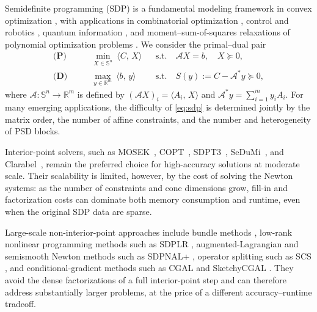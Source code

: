 \documentclass[11pt]{article}
\theoremstyle{definition}
\theoremstyle{remark}
\newcommand{\R}{\mathbb{R}}                 %
\newcommand{\Sym}[1]{\mathbb{S}^{#1}}       %
\newcommand{\inner}[2]{\langle #1,\, #2\rangle}
\newcommand{\Aop}{\mathcal{A}}              %
\newcommand{\Aadj}{\mathcal{A}^{*}}         %
\newcommand{\Cobj}{C}                       %
\newcommand{\bvec}{b}                       %
\newcommand{\Xvar}{X}                       %
\newcommand{\yvar}{y}                       %
\newcommand{\Zslack}{S}                     %
\begin{document}
Semidefinite programming (SDP) is a fundamental modeling framework in convex
optimization \cite{Todd2001,BoydVandenberghe2004}, with applications in combinatorial optimization \cite{han2002improved,burer2001projected}, control and
robotics \cite{kang2024fast,kang2025global}, quantum information \cite{childs2007quantum,low2025fast}, and moment--sum-of-squares relaxations of
polynomial optimization problems \cite{lasserre2001global,lasserre2006convergent}.  We consider the primal--dual pair
\begin{equation}
\begin{aligned}
\textbf{(P)}\qquad
&\min_{\Xvar\in\Sym{n}}\ \inner{\Cobj}{\Xvar}
&&\text{s.t.}\quad
  \Aop\Xvar=\bvec,\quad \Xvar\succeq0, \\
\textbf{(D)}\qquad
&\max_{\yvar\in\R^m}\ \inner{\bvec}{\yvar}
&&\text{s.t.}\quad
  \Zslack(\yvar):=\Cobj-\Aadj\yvar\succeq0,
\end{aligned}
\label{eq:sdp}
\end{equation}
where $\Aop:\Sym{n}\to\R^m$ is defined by
$(\Aop\Xvar)_i=\inner{A_i}{\Xvar}$ and
$\Aadj\yvar=\sum_{i=1}^m \yvar_i A_i$.
For many emerging applications, the difficulty of \eqref{eq:sdp} is determined
jointly by the matrix order, the number of affine constraints, and the number
and heterogeneity of PSD blocks.

Interior-point solvers, such as MOSEK~\cite{aps2019mosek},
COPT~\cite{ge2022cardinal}, SDPT3~\cite{toh2012implementation},
SeDuMi~\cite{sturm1999using}, and Clarabel~\cite{goulart2026clarabel},
remain the preferred choice for high-accuracy solutions at moderate scale.
Their scalability is limited, however, by the cost of solving the Newton
systems: as the number of constraints and cone dimensions grow, fill-in and
factorization costs can dominate both memory consumption and runtime, even
when the original SDP data are sparse.

Large-scale non-interior-point approaches include bundle methods
\cite{liao2026overview,ding2023revisiting}, low-rank nonlinear programming
methods such as SDPLR \cite{BurerMonteiro2003,spdlr}, augmented-Lagrangian
and semismooth Newton methods such as SDPNAL+
\cite{zhao2010newton,yang2015sdpnal+,sun2020sdpnal+}, operator splitting such
as SCS \cite{o2016conic}, and conditional-gradient methods such as CGAL and
SketchyCGAL
\cite{yurtsever2019conditional,yurtsever2018conditional,yurtsever2021scalable}.
They avoid the dense factorizations of a full interior-point step and can
therefore address substantially larger problems, at the price of a different
accuracy--runtime tradeoff.
\end{document}
